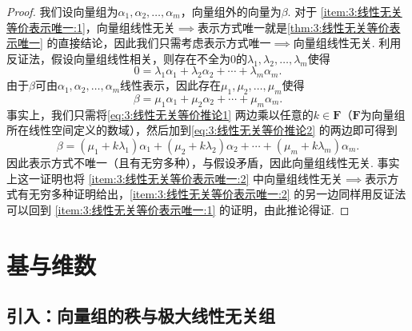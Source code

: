 \begin{enumerate}
          \begin{proof}
              我们设向量组为$\alpha_1,\alpha_2,\ldots,\alpha_m$，向量组外的向量为$\beta$. 对于 \ref*{item:3:线性无关等价表示唯一:1}，向量组线性无关$\implies$表示方式唯一就是\autoref{thm:3:线性无关等价表示唯一} 的直接结论，因此我们只需考虑表示方式唯一$\implies$向量组线性无关. 利用反证法，假设向量组线性相关，则存在不全为0的$\lambda_1,\lambda_2,\ldots,\lambda_m$使得
              \begin{equation}\label{eq:3:线性无关等价推论1}
                  0=\lambda_1\alpha_1+\lambda_2\alpha_2+\cdots+\lambda_m\alpha_m.
              \end{equation}
              由于$\beta$可由$\alpha_1,\alpha_2,\ldots,\alpha_m$线性表示，因此存在$\mu_1,\mu_2,\ldots,\mu_m$使得
              \begin{equation}\label{eq:3:线性无关等价推论2}
                  \beta=\mu_1\alpha_1+\mu_2\alpha_2+\cdots+\mu_m\alpha_m.
              \end{equation}
              事实上，我们只需将\autoref{eq:3:线性无关等价推论1} 两边乘以任意的$k\in\mathbf{F}$（$\mathbf{F}$为向量组所在线性空间定义的数域），然后加到\autoref{eq:3:线性无关等价推论2} 的两边即可得到
              \[\beta=(\mu_1+k\lambda_1)\alpha_1+(\mu_2+k\lambda_2)\alpha_2+\cdots+(\mu_m+k\lambda_m)\alpha_m.\]
              因此表示方式不唯一（且有无穷多种），与假设矛盾，因此向量组线性无关. 事实上这一证明也将 \ref*{item:3:线性无关等价表示唯一:2} 中向量组线性无关$\implies$表示方式有无穷多种证明给出，\ref*{item:3:线性无关等价表示唯一:2} 的另一边同样用反证法可以回到 \ref*{item:3:线性无关等价表示唯一:1} 的证明，由此推论得证.
          \end{proof}
\end{enumerate}

\section{基与维数}

\subsection{引入：向量组的秩与极大线性无关组}

